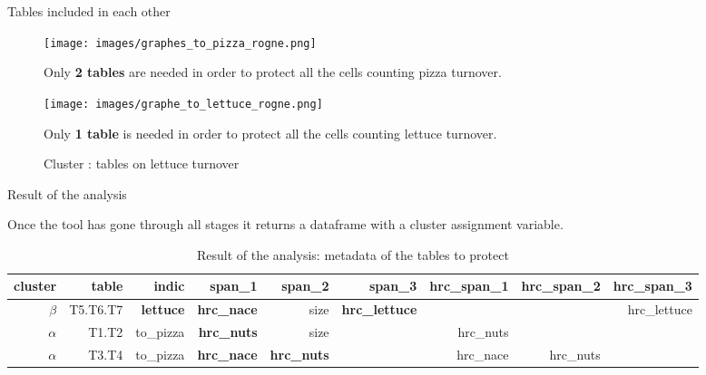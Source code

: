 \documentclass[final]{beamer}
\newlength{\colwidth}
\begin{document}
\begin{frame}[fragile]
\begin{columns}[t]
\begin{column}{\colwidth}
\begin{block}{Tables included in each other}
    \begin{figure}[ht]
    \centering
    \begin{minipage}{0.48\textwidth}  %
        \centering
        \texttt{[image: images/graphes\_to\_pizza\_rogne.png]}
        \caption{Cluster \alpha : tables on pizza turnover}
        \label{graph_pizza}
        Only \textbf{2 tables} are needed in order to protect all the cells counting pizza turnover.
    \end{minipage}%
    \hfill
    \begin{minipage}{0.48\textwidth}  %
        \centering
        \texttt{[image: images/graphe\_to\_lettuce\_rogne.png]}
        \caption{Cluster \beta : tables on lettuce turnover}
        \label{graph_lettuce}
        Only \textbf{1 table} is needed in order to protect all the cells counting lettuce turnover.
    \end{minipage}
    \end{figure}

  \end{block}

  \begin{block}{Result of the analysis}

    Once the tool has gone through all stages it returns a dataframe with a cluster assignment variable.

    \vspace{-0.5cm}
    
    \begin{table}
      \centering
      \begin{tabular}{r r r r r r r r r}
        \toprule
        \textbf{cluster} & \textbf{table} & \textbf{indic} & \textbf{span\_1} & \textbf{span\_2} & \textbf{span\_3} & \textbf{hrc\_span\_1} &  \textbf{hrc\_span\_2} & \textbf{hrc\_span\_3} \\
        \midrule
        \rowcolor{insee_light_green} $\beta$ & T5.T6.T7 & \textbf{lettuce} & \textbf{hrc\_nace} & size & \textbf{hrc\_lettuce} &  &  & hrc\_lettuce \\
        \rowcolor{insee_light_red} $\alpha$ & T1.T2 & to\_pizza & \textbf{hrc\_nuts} & size &  & hrc\_nuts &  &  \\
        \rowcolor{insee_light_red} $\alpha$ & T3.T4 & to\_pizza & \textbf{hrc\_nace} & \textbf{hrc\_nuts} &  & hrc\_nace  &  hrc\_nuts &   \\
        \bottomrule
      \end{tabular}
      \caption{Result of the analysis: metadata of the tables to protect}
    \end{table}


\end{block}
\end{column}
\end{columns}
\end{frame}
\end{document}
